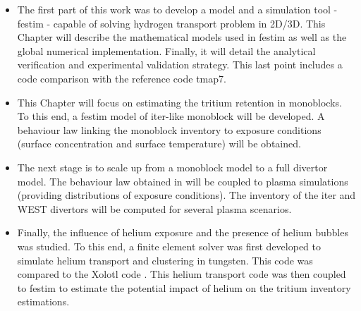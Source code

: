 \begin{itemize}
    \item \textbf{} \newline
The first part of this work was to develop a model and a simulation tool - \acrshort{festim} - capable of solving hydrogen transport problem in 2D/3D.
This Chapter will describe the mathematical models used in \acrshort{festim} as well as the global numerical implementation.
Finally, it will detail the analytical verification and experimental validation strategy.
This last point includes a code comparison with the reference code \acrshort{tmap7}.
    \item \textbf{} \newline
This Chapter will focus on estimating the tritium \gls{retention} in \glspl{monoblock}.
To this end, a \acrshort{festim} model of \acrshort{iter}-like \gls{monoblock} will be developed.
A behaviour law linking the \gls{monoblock} \gls{inventory} to exposure conditions (surface concentration and surface temperature) will be obtained.
    \item \textbf{} \newline
The next stage is to scale up from a \gls{monoblock} model to a full \gls{divertor} model.
The behaviour law obtained in  will be coupled to \gls{plasma} simulations (providing distributions of exposure conditions).
The \gls{inventory} of the \acrshort{iter} and WEST \glspl{divertor} will be computed for several \gls{plasma} scenarios.
    \item \textbf{} \newline
Finally, the influence of helium exposure and the presence of helium bubbles was studied.
To this end, a finite element solver was first developed to simulate helium transport and clustering in tungsten.
This code was compared to the Xolotl code .
This helium transport code was then coupled to \acrshort{festim} to estimate the potential impact of helium on the tritium \gls{inventory} estimations.
\end{itemize}
